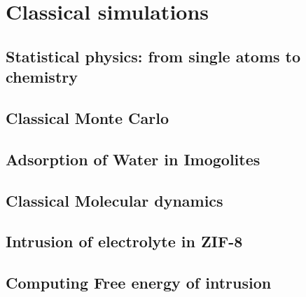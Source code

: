 \documentclass[thesis]{subfiles}
\begin{document}
\chapter{Classical simulations}
\startcontents[chapters]
\printpartialtoc

\section{Statistical physics: from single atoms to chemistry}

\section{Classical Monte Carlo}

\section{Adsorption of Water in Imogolites}

\section{Classical Molecular dynamics}

\section{Intrusion of electrolyte in ZIF-8}

\section{Computing Free energy of intrusion}
\end{document}
